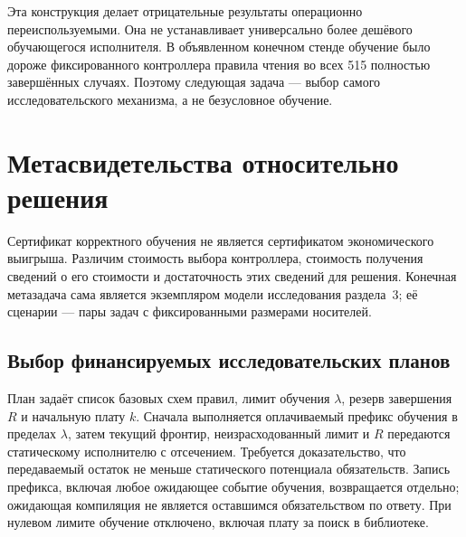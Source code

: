 \documentclass[10pt,a4paper]{article}
\begin{document}
Эта конструкция делает отрицательные результаты операционно переиспользуемыми. Она не устанавливает универсально более дешёвого обучающегося исполнителя. В объявленном конечном стенде обучение было дороже фиксированного контроллера правила чтения во всех 515 полностью завершённых случаях. Поэтому следующая задача --- выбор самого исследовательского механизма, а не безусловное обучение.
\clearpage
\section{Метасвидетельства относительно решения}\label{sec:meta-evidence}
Сертификат корректного обучения не является сертификатом экономического выигрыша. Различим стоимость выбора контроллера, стоимость получения сведений о его стоимости и достаточность этих сведений для решения. Конечная метазадача сама является экземпляром модели исследования раздела~3; её сценарии --- пары задач с фиксированными размерами носителей.

\subsection{Выбор финансируемых исследовательских планов}
План задаёт список базовых схем правил, лимит обучения $\lambda$, резерв завершения $R$ и начальную плату $k$. Сначала выполняется оплачиваемый префикс обучения в пределах $\lambda$, затем текущий фронтир, неизрасходованный лимит и $R$ передаются статическому исполнителю с отсечением. Требуется доказательство, что передаваемый остаток не меньше статического потенциала обязательств. Запись префикса, включая любое ожидающее событие обучения, возвращается отдельно; ожидающая компиляция не является оставшимся обязательством по ответу. При нулевом лимите обучение отключено, включая плату за поиск в библиотеке.
\end{document}
